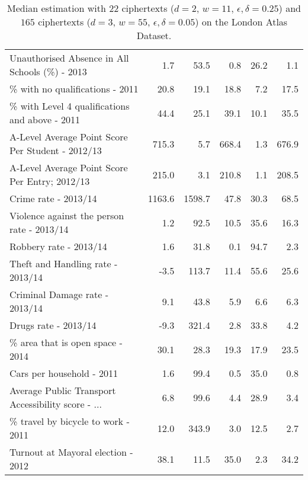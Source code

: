 \documentclass[conference]{IEEEtran}
\begin{document}
\begin{table*}[t]
\begin{tabular}{lrrrrr}
Unauthorised Absence in All Schools (\%) - 2013     &            1.7 &       53.5 &            0.8 &       26.2 &     1.1 \\
\% with no qualifications - 2011                    &           20.8 &       19.1 &           18.8 &        7.2 &    17.5 \\
\% with Level 4 qualifications and above - 2011     &           44.4 &       25.1 &           39.1 &       10.1 &    35.5 \\
A-Level Average Point Score Per Student - 2012/13  &          715.3 &        5.7 &          668.4 &        1.3 &   676.9 \\
A-Level Average Point Score Per Entry; 2012/13     &          215.0 &        3.1 &          210.8 &        1.1 &   208.5 \\
Crime rate - 2013/14                               &         1163.6 &     1598.7 &           47.8 &       30.3 &    68.5 \\
Violence against the person rate - 2013/14         &            1.2 &       92.5 &           10.5 &       35.6 &    16.3 \\
Robbery rate - 2013/14                             &            1.6 &       31.8 &            0.1 &       94.7 &     2.3 \\
Theft and Handling rate - 2013/14                  &           -3.5 &      113.7 &           11.4 &       55.6 &    25.6 \\
Criminal Damage rate - 2013/14                     &            9.1 &       43.8 &            5.9 &        6.6 &     6.3 \\
Drugs rate - 2013/14                               &           -9.3 &      321.4 &            2.8 &       33.8 &     4.2 \\
\% area that is open space - 2014                   &           30.1 &       28.3 &           19.3 &       17.9 &    23.5 \\
Cars per household - 2011                          &            1.6 &       99.4 &            0.5 &       35.0 &     0.8 \\
Average Public Transport Accessibility score - ... &            6.8 &       99.6 &            4.4 &       28.9 &     3.4 \\
\% travel by bicycle to work - 2011                 &           12.0 &      343.9 &            3.0 &       12.5 &     2.7 \\
Turnout at Mayoral election - 2012                 &           38.1 &       11.5 &           35.0 &        2.3 &    34.2 \\
\hline
\end{tabular}
\caption{Median estimation with $22$ ciphertexts ($d=2$, $w=11$, $\epsilon, \delta = 0.25$) and $165$ ciphertexts ($d=3$, $w=55$, $\epsilon, \delta = 0.05$) on the London Atlas Dataset.}\label{tab:stats}
\end{table*}
\end{document}
